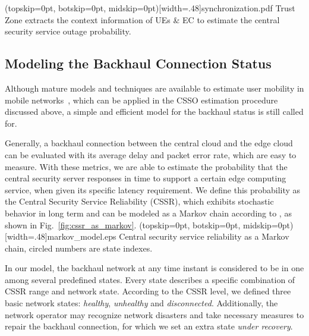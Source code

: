 \documentclass{ieeeaccess}
\newcommand{\change}[1]{#1}
\begin{document}
	
	\Figure[htbp!](topskip=0pt, botskip=0pt, midskip=0pt)[width=.48\textwidth]{synchronization.pdf}
	{Trust Zone extracts the context information of UEs \& EC to estimate the central security service outage probability.\label{fig:synchronization}}	
	
	
	\subsection{Modeling the Backhaul Connection Status}\label{sec:model}
	Although mature models and techniques are available to estimate user \change{mobility} in mobile networks~\cite{ge2016user}, which can be applied in the CSSO estimation procedure discussed above, a simple and efficient model for the backhaul status is still called for.
	
	Generally, a backhaul connection between the central cloud and the edge cloud can be evaluated with its average delay and packet error rate, which are easy to measure. With these metrics, we are able to estimate the probability that the central security server responses in time to support a certain edge computing service, when given its specific latency requirement. We define this probability as the Central Security Service Reliability (CSSR), which exhibits stochastic behavior in long term and can be modeled as a Markov chain \change{according to \cite{pukite1998markov}}, as shown in Fig.~\ref{fig:cssr_as_markov}.
	\Figure[htbp!](topskip=0pt, botskip=0pt, midskip=0pt)[width=.48\textwidth]{markov_model.eps}
	{Central security service reliability as a Markov chain, circled numbers are state indexes.\label{fig:cssr_as_markov}}	
	
	In our model, the backhaul network at any time instant is considered to be in one among several predefined states. Every state describes a specific combination of CSSR range and network state. According to the CSSR level, we defined three basic network states: \textit{healthy}, \textit{unhealthy} and \textit{disconnected}. Additionally, the network operator may recognize network disasters and take necessary measures to repair the backhaul connection, for which we set an extra state \textit{under recovery}. 
	
\end{document}
